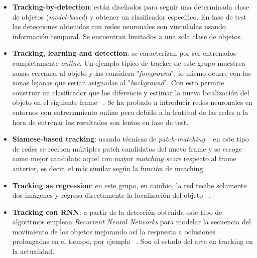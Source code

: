 \documentclass{bmvc2k}
\begin{document}
\begin{itemize}
\item \textbf{Tracking-by-detection}: están diseñados para seguir una determinada clase de objetos (\textit{model-based}) y obtener un clasificador específico. En fase de test las detecciones obtenidas con redes neuronales son vinculadas usando información temporal. Se encuentran limitados a una sola clase de objetos.
\item \textbf{Tracking, learning and detection}: se caracterizan por ser entrenados completamente \textit{online}. Un ejemplo típico de tracker de este grupo muestrea zonas cercanas al objeto y las considera "\textit{foreground}", lo mismo ocurre con las zonas lejanas que serían asignadas al "\textit{background}". Con esto permite construir un clasificador que los diferencie y estimar la nueva localización del objeto en el siguiente frame ~\cite{babenko2009visual}. Se ha probado a introducir redes neuronales en entornos con entrenamiento online pero debido a la lentitud de las redes a la hora de entrenar los resultados son lentos en fase de test.
\item \textbf{Siamese-based tracking}: usando técnicas de \textit{patch-matching} ~\cite{tao2016siamese} en este tipo de redes se reciben múltiples patch candidatos del nuevo frame y se escoge como mejor candidato aquel con mayor \textit{matching score} respecto al frame anterior, es decir, el más similar según la función de matching.
\item \textbf{Tracking as regression}: en este grupo, en cambio, la red recibe solamente dos imágenes y regresa directamente la localización del objeto ~\cite{held2016learning}.
\item \textbf{Tracking con RNN}: a partir de la detección obtenida este tipo de algoritmos emplean \textit{Recurrent Neural Networks} para modelar la secuencia del movimiento de los objetos mejorando así la respuesta a oclusiones prolongadas en el tiempo, por ejemplo ~\cite{sadeghian2017tracking}. Son el estado del arte en tracking en la actualidad.
\end{itemize}
\end{document}
